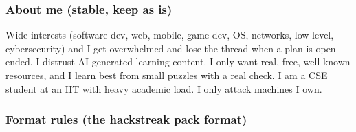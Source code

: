 \hypertarget{new-unit-request-template-about-me-stable-keep-as-is}{%
\subsubsection{About me (stable, keep as
is)}\label{new-unit-request-template-about-me-stable-keep-as-is}}

Wide interests (software dev, web, mobile, game dev, OS, networks,
low-level, cybersecurity) and I get overwhelmed and lose the thread when
a plan is open-ended. I distrust AI-generated learning content. I only
want real, free, well-known resources, and I learn best from small
puzzles with a real check. I am a CSE student at an IIT with heavy
academic load. I only attack machines I own.

\hypertarget{new-unit-request-template-format-rules-the-hackstreak-pack-format}{%
\subsubsection{Format rules (the hackstreak pack
format)}\label{new-unit-request-template-format-rules-the-hackstreak-pack-format}}

